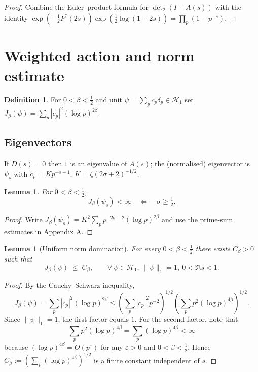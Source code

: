 \documentclass[12pt]{article}
\newtheorem{lemma}[theorem]{Lemma}
\theoremstyle{definition}
\newtheorem{definition}[theorem]{Definition}
\theoremstyle{remark}
\newcommand{\Hspace}{\mathcal H}
\newcommand{\Zeta}{\zeta}
\begin{document}
\begin{proof}
Combine the Euler--product formula for \(\det_{2}(I-A(s))\)
with the identity
\(\exp(-\tfrac12P^{\!*}(2s))\exp(\tfrac12\log(1-2s))=
  \prod_{p}(1-p^{-s})\).
\end{proof}

\section{Weighted action and norm estimate}

\begin{definition}
For \(0<\beta<\tfrac12\) and unit \(\psi=\sum_{p}c_p\delta_p\in\Hspace_1\)
set \(J_\beta(\psi)=\sum_{p}|c_p|^{2}(\log p)^{2\beta}\).
\end{definition}

\subsection*{Eigenvectors}
If \(D(s)=0\) then \(1\) is an eigenvalue of \(A(s)\); the (normalised)
eigenvector is \(\psi_s\) with
\(c_p = K p^{-s-1}\),
\(K=\Zeta(2\sigma+2)^{-1/2}\).

\begin{lemma}\label{lem:div}
For \(0<\beta<\tfrac12\),
\[
  J_\beta(\psi_s)<\infty\quad\Longleftrightarrow\quad \sigma\ge\tfrac12.
\]
\end{lemma}

\begin{proof}
Write \(J_\beta(\psi_s)=K^{2}\sum_{p}p^{-2\sigma-2}(\log p)^{2\beta}\)
and use the prime-sum estimates in Appendix A.
\end{proof}

\begin{lemma}[Uniform norm domination]\label{lem:Schur}
For every \(0<\beta<\frac12\) there exists \(C_\beta>0\) such that
\[
        J_\beta(\psi)\;\le\;C_\beta,
        \qquad
        \forall\,\psi\in\Hspace_{1},\ \|\psi\|_1=1,\
        0<\Re s<1.
\]
\end{lemma}

\begin{proof}
By the Cauchy--Schwarz inequality,
\[
   J_\beta(\psi)
   = \sum_{p}|c_p|^{2}(\log p)^{2\beta}
   \le \left(\sum_{p}|c_p|^{2}p^{-2}\right)^{1/2}
       \left(\sum_{p}p^{2}(\log p)^{4\beta}\right)^{1/2}.
\]
Since \(\|\psi\|_1=1\), the first factor equals \(1\).
For the second factor, note that
\[
   \sum_{p}p^{2}(\log p)^{4\beta}
   = \sum_{p}(\log p)^{4\beta}
   < \infty
\]
because \((\log p)^{4\beta}=O(p^\varepsilon)\) for any \(\varepsilon>0\)
and \(0<\beta<\tfrac12\).
Hence \(C_\beta := \left(\sum_{p}(\log p)^{4\beta}\right)^{1/2}\)
is a finite constant independent of \(s\).
\end{proof}
\end{document}
